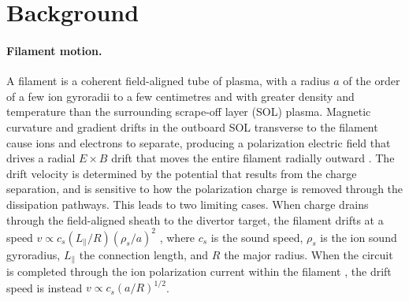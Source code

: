\section{Background}
\label{sec:background}

\paragraph{Filament motion.}
A filament is a coherent field-aligned tube of plasma, with a radius $a$ of the order of a few ion gyroradii to a few centimetres \citep{krasheninnikov2001scrape} and with greater density and temperature than the surrounding scrape-off layer (SOL) plasma. Magnetic curvature and gradient drifts in the outboard SOL transverse to the filament cause ions and electrons to separate, producing a polarization electric field that drives a radial $E \times B$ drift that moves the entire filament radially outward \citep{krasheninnikov2001scrape, dippolito2011convective}. The drift velocity is determined by the potential that results from the charge separation, and is sensitive to how the polarization charge is removed through the dissipation pathways. This leads to two limiting cases. When charge drains through the field-aligned sheath to the divertor target, the filament drifts at a speed $v \propto c_s (L_\parallel/R)(\rho_s/a)^2$ \citep{krasheninnikov2001scrape}, where $c_s$ is the sound speed, $\rho_s$ is the ion sound gyroradius, $L_\parallel$ the connection length, and $R$ the major radius. When the circuit is completed through the ion polarization current within the filament \citep{garcia2006fluctuations}, the drift speed is instead $v \propto c_s (a/R)^{1/2}$.

